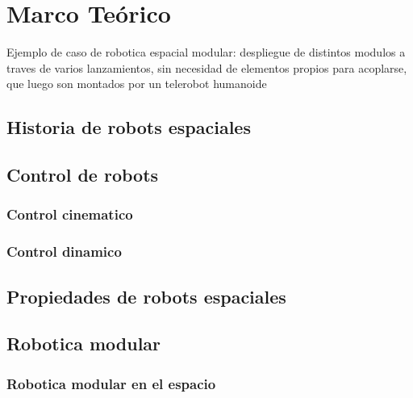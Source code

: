 
\chapter{Marco Teórico}
\label{marcoteorico}

Ejemplo de caso de robotica espacial modular: despliegue de distintos modulos a traves de varios lanzamientos, sin necesidad de elementos propios para acoplarse, que luego son montados por un telerobot humanoide

\section{Historia de robots espaciales}

\section{Control de robots}

\subsection{Control cinematico}

\subsection{Control dinamico}

\section{Propiedades de robots espaciales}

\section{Robotica modular}

\subsection{Robotica modular en el espacio}



